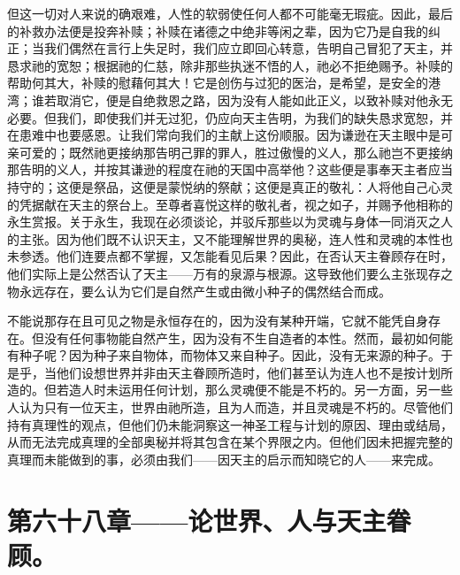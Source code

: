 但这一切对人来说的确艰难，人性的软弱使任何人都不可能毫无瑕疵。因此，最后的补救办法便是投奔补赎；补赎在诸德之中绝非等闲之辈，因为它乃是自我的纠正；当我们偶然在言行上失足时，我们应立即回心转意，告明自己冒犯了天主，并恳求祂的宽恕；根据祂的仁慈，除非那些执迷不悟的人，祂必不拒绝赐予。补赎的帮助何其大，补赎的慰藉何其大！它是创伤与过犯的医治，是希望，是安全的港湾；谁若取消它，便是自绝救恩之路，因为没有人能如此正义，以致补赎对他永无必要。但我们，即使我们并无过犯，仍应向天主告明，为我们的缺失恳求宽恕，并在患难中也要感恩。让我们常向我们的主献上这份顺服。因为谦逊在天主眼中是可亲可爱的；既然祂更接纳那告明己罪的罪人，胜过傲慢的义人，那么祂岂不更接纳那告明的义人，并按其谦逊的程度在祂的天国中高举他？这些便是事奉天主者应当持守的；这便是祭品，这便是蒙悦纳的祭献；这便是真正的敬礼：人将他自己心灵的凭据献在天主的祭台上。至尊者喜悦这样的敬礼者，视之如子，并赐予他相称的永生赏报。关于永生，我现在必须谈论，并驳斥那些以为灵魂与身体一同消灭之人的主张。因为他们既不认识天主，又不能理解世界的奥秘，连人性和灵魂的本性也未参透。他们连要点都不掌握，又怎能看见后果？因此，在否认天主眷顾存在时，他们实际上是公然否认了天主——万有的泉源与根源。这导致他们要么主张现存之物永远存在，要么认为它们是自然产生或由微小种子的偶然结合而成。\par

不能说那存在且可见之物是永恒存在的，因为没有某种开端，它就不能凭自身存在。但没有任何事物能自然产生，因为没有不生自造者的本性。然而，最初如何能有种子呢？因为种子来自物体，而物体又来自种子。因此，没有无来源的种子。于是乎，当他们设想世界并非由天主眷顾所造时，他们甚至认为连人也不是按计划所造的。但若造人时未运用任何计划，那么灵魂便不能是不朽的。另一方面，另一些人认为只有一位天主，世界由祂所造，且为人而造，并且灵魂是不朽的。尽管他们持有真理性的观点，但他们仍未能洞察这一神圣工程与计划的原因、理由或结局，从而无法完成真理的全部奥秘并将其包含在某个界限之内。但他们因未把握完整的真理而未能做到的事，必须由我们——因天主的启示而知晓它的人——来完成。\par


\section{第六十八章——论世界、人与天主眷顾。}

